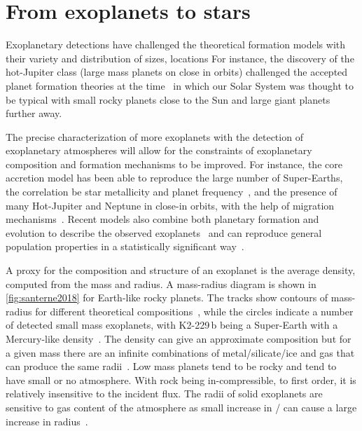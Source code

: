 
\section{From exoplanets to stars}

Exoplanetary detections have challenged the theoretical formation models with their variety and distribution of sizes, locations For instance, the discovery of the hot-Jupiter class (large mass planets on close in orbits) challenged the accepted planet formation theories at the time~\citep[.e.g][]{pollack_formation_1996, boss_giant_1997} in which our Solar System was thought to be typical with small rocky planets close to the Sun and large giant planets further away.

The precise characterization of more exoplanets with the detection of exoplanetary atmospheres will allow for the constraints of exoplanetary composition and formation mechanisms to be improved.
For instance, the core accretion model has been able to reproduce the large number of Super-Earths, the correlation be star metallicity and planet frequency~\citep[e.g.][]{santos_spectroscopic_2004, fischer_planetmetallicity_2005}, and the presence of many Hot-Jupiter and Neptune in close-in orbits, with the help of migration mechanisms~\citep[e.g.][]{triaud_exoplanets_2016}.
Recent models also combine both planetary formation and evolution to describe the observed exoplanets~\citep[e.g.][]{mordasini_characterization_2012} and can reproduce general population properties in a statistically significant way~\citep{mordasini_extrasolar_2009}.

A proxy for the composition and structure of an exoplanet is the average density, computed from the mass and radius.
A mass-radius diagram is shown in \cref{fig:santerne2018} for Earth-like rocky planets.
The tracks show contours of mass-radius for different theoretical compositions~\citep{brugger_constraints_2017}, while the circles indicate a number of detected small mass exoplanets, with {K2-229\,b} being a Super-Earth with a Mercury-like density~\cite{santerne_earthsized_2018}.
The density can give an approximate composition but for a given mass there are an infinite combinations of metal/silicate/ice and gas that can produce the same radii~\citep[e.g.][]{seager_massradius_2007}.
Low mass planets tend to be rocky and tend to have small or no atmosphere.
With rock being in-compressible, to first order, it is relatively insensitive to the incident flux.
The radii of solid exoplanets are sensitive to gas content of the atmosphere as small increase in / can cause a large increase in radius~\citep{adams_ocean_2008}.

